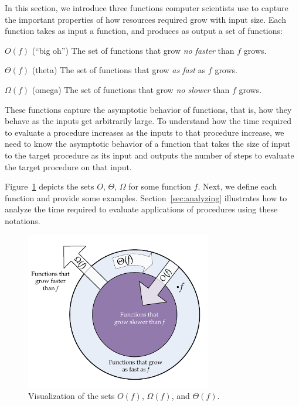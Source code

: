 \begin{schemeregion}
In this section, we introduce three functions computer scientists use to capture the important properties of how resources required grow with input size.  Each function takes as input a function, and produces as output a set of functions:
\begin{descriptionlist}
\item [$O(f)$ (``big oh'')] \forcenl The set of functions that grow \emph{no faster} than $f$ grows.
\item [$\Theta(f)$ (theta)] \forcenl The set of functions that grow \emph{as fast} as $f$ grows.
\item [$\Omega(f)$ (omega)] \forcenl The set of functions that grow \emph{no slower} than $f$ grows.
\end{descriptionlist}
These functions capture the asymptotic behavior of functions, that is, how they behave as the inputs get arbitrarily large.  To understand how the time required to evaluate a procedure increases as the inputs to that procedure increase, we need to know the asymptotic behavior of a function that takes the size of input to the target procedure as its input and outputs the number of steps to evaluate the target procedure on that input.

Figure~\ref{fig-visual} depicts the sets $O$, $\Theta$, $\Omega$ for some function $f$.  Next, we define each function and provide some examples.  Section~\ref{sec:analyzing} illustrates how to analyze the time required to evaluate applications of procedures using these notations. %

\begin{figure}[bthp]\label{fig-visual}
\begin{center}
\includegraphics[width=3.2in]{figures/theta.pdf}
\caption{Visualization of the sets $O(f)$, $\Omega(f)$, and $\Theta(f)$.}
\end{center}
\end{figure}


\end{schemeregion}
